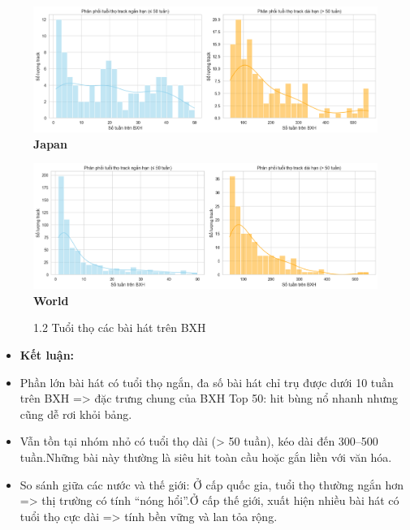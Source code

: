 \begin{itemize}
\begin{figure}[H]
        \begin{minipage}{0.45\textwidth}
            \centering
            \includegraphics[width=\linewidth]{../graphics/data_top50/figure/11/EDA_japan.png}
            \\[4pt] {\small \textbf{Japan}}
        \end{minipage}
        \hfill
        \begin{minipage}{0.45\textwidth}
            \centering
            \includegraphics[width=\linewidth]{../graphics/data_top50/figure/11/EDA_world.png}
            \\[4pt] {\small \textbf{World}}
        \end{minipage}

        \caption{1.2 Tuổi thọ các bài hát trên BXH}
        \label{fig:energy-regions}
    \end{figure}


          \begin{itemize}
              \item \textbf{Kết luận: }
              \item Phần lớn bài hát có tuổi thọ ngắn, đa số bài hát chỉ trụ được dưới 10 tuần trên BXH => đặc trưng chung của BXH Top 50: hit bùng nổ nhanh nhưng cũng dễ rơi khỏi bảng.
              \item Vẫn tồn tại nhóm nhỏ có tuổi thọ dài (> 50 tuần), kéo dài đến 300–500 tuần.Những bài này thường là siêu hit toàn cầu hoặc gắn liền với văn hóa. 
              \item So sánh giữa các nước và thế giới: Ở cấp quốc gia, tuổi thọ thường ngắn hơn => thị trường có tính “nóng hổi”.Ở cấp thế giới, xuất hiện nhiều bài hát có tuổi thọ cực dài => tính bền vững và lan tỏa rộng.
              

\end{itemize}
\end{itemize}
